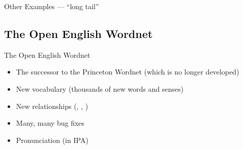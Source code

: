 \documentclass{beamer}
\begin{document}
\begin{frame}[allowframebreaks]{Other Examples ---  ``long tail''}
\begin{exe}
\end{exe}

\end{frame}



    

\subsection{The Open English Wordnet}
  \begin{frame}{The Open English Wordnet}
      \begin{itemize}
      \item The successor to the Princeton Wordnet (which is no
        longer developed)
      \item New vocabulary (thousands of new words and senses)
      \item New relationships (, , )
      \item Many, many bug fixes
      \item Pronunciation (in IPA)
      \end{itemize}

  \end{frame}
\end{document}
